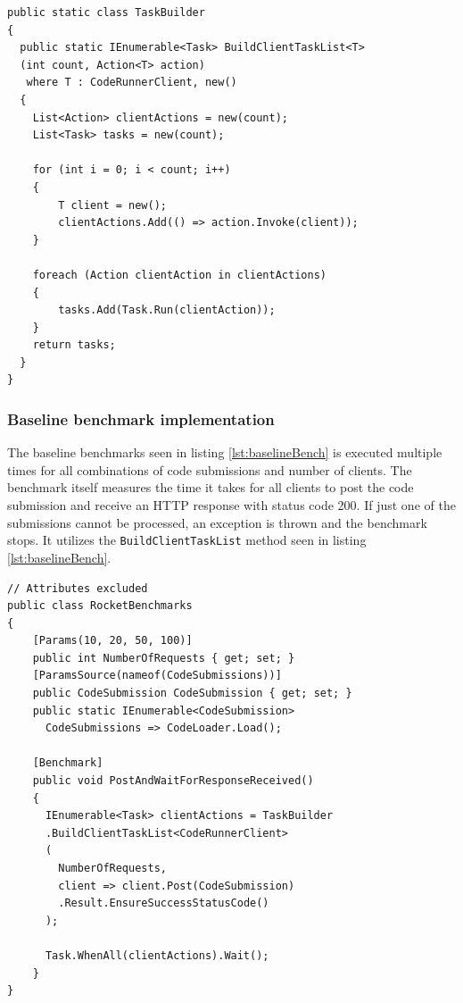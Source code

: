 \begin{lstlisting}[language=CSharp, escapechar=~, caption={C\# code showing the \texttt{BuildClientTaskList} method, which is used to build a number of actions which are executed simultaneously in a Task}, label={lst:TaskBuilder}]
public static class TaskBuilder
{
  public static IEnumerable<Task> BuildClientTaskList<T>
  (int count, Action<T> action)
   where T : CodeRunnerClient, new()
  {
    List<Action> clientActions = new(count);
    List<Task> tasks = new(count);
    
    for (int i = 0; i < count; i++)
    {
        T client = new();
        clientActions.Add(() => action.Invoke(client));
    }

    foreach (Action clientAction in clientActions)
    {
        tasks.Add(Task.Run(clientAction));
    }
    return tasks;
  }
}
\end{lstlisting}

\subsubsection{Baseline benchmark implementation}
The baseline benchmarks seen in listing \ref{lst:baselineBench} is executed multiple times for all combinations of code submissions and number of clients.
The benchmark itself measures the time it takes for all clients to post the code submission and receive an HTTP response with status code 200.
If just one of the submissions cannot be processed, an exception is thrown and the benchmark stops.
It utilizes the \texttt{BuildClientTaskList} method seen in listing \ref{lst:baselineBench}.
\begin{lstlisting}[language=CSharp, escapechar=~, caption={C\# code showing the benchmark implementation for the synchronous baseline}, label={lst:baselineBench}]
// Attributes excluded
public class RocketBenchmarks
{
    [Params(10, 20, 50, 100)] 
    public int NumberOfRequests { get; set; }
    [ParamsSource(nameof(CodeSubmissions))]
    public CodeSubmission CodeSubmission { get; set; }
    public static IEnumerable<CodeSubmission> 
      CodeSubmissions => CodeLoader.Load();

    [Benchmark]
    public void PostAndWaitForResponseReceived()
    {
      IEnumerable<Task> clientActions = TaskBuilder
      .BuildClientTaskList<CodeRunnerClient>
      (
        NumberOfRequests,
        client => client.Post(CodeSubmission)
        .Result.EnsureSuccessStatusCode()
      );
        
      Task.WhenAll(clientActions).Wait();
    }
}
\end{lstlisting}

